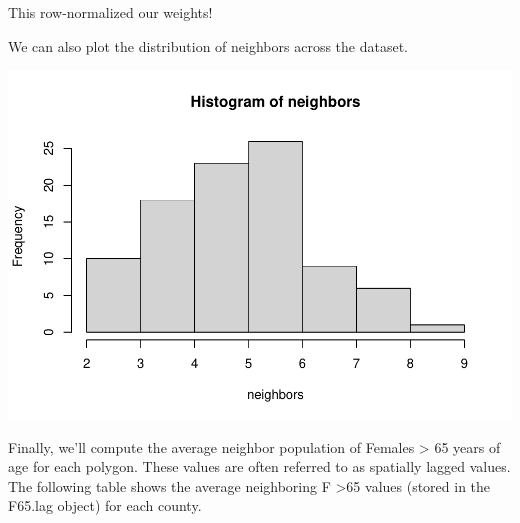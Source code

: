 \documentclass[]{article}
\newenvironment{Shaded}{\begin{snugshade}}{\end{snugshade}}
\newcommand{\CommentTok}[1]{\textcolor[rgb]{0.56,0.35,0.01}{\textit{#1}}}
\newcommand{\FunctionTok}[1]{\textcolor[rgb]{0.00,0.00,0.00}{#1}}
\newcommand{\NormalTok}[1]{#1}
\newcommand{\OtherTok}[1]{\textcolor[rgb]{0.56,0.35,0.01}{#1}}
\newcommand{\SpecialCharTok}[1]{\textcolor[rgb]{0.00,0.00,0.00}{#1}}
\newcommand{\StringTok}[1]{\textcolor[rgb]{0.31,0.60,0.02}{#1}}
\begin{document}
This row-normalized our weights!

We can also plot the distribution of neighbors across the dataset.

\begin{Shaded}
\end{Shaded}

\includegraphics{lab03_files/figure-latex/plotneighbors-1.pdf}

Finally, we'll compute the average neighbor population of Females
\textgreater{} 65 years of age for each polygon. These values are often
referred to as spatially lagged values. The following table shows the
average neighboring F \textgreater65 values (stored in the F65.lag
object) for each county.

\begin{Shaded}
\end{Shaded}
\end{document}
